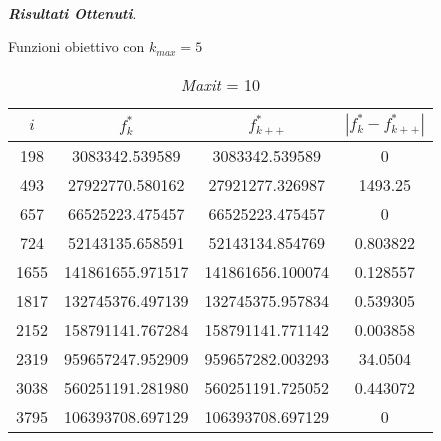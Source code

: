 \documentclass[12pt,a4paper,oneside,hidelinks]{report}
\begin{document}
\paragraph*{}
\textbf{\textit{Risultati Ottenuti}}.

\vspace*{\fill}


\begin{table}[ht]%
	\centering
	\caption{Funzioni obiettivo con $k_{max} = 5$}\label{tab:b1}

	\def\arraystretch{1.4}

	\begin{subtable}{\textwidth}
		\centering
		\begin{tabular}{|S[table-parse-only = true]
						|S[table-format = 9.6, table-number-alignment = center]
						|S[table-format = 9.6, table-number-alignment = center]
						|S[table-parse-only = true]|}
			
			\hline			
			{$i$} & {$f_{k}^*$} & {$f_{k++}^*$} & {$|f_{k}^* - f_{k++}^*|$} \\
			
			\hline		
		
			198  &  3083342.539589   & 3083342.539589   & 0  \\
			493  &  27922770.580162  & 27921277.326987  & 1493.25 \\
			657  &  66525223.475457  & 66525223.475457  & 0 \\
			724  &  52143135.658591  & 52143134.854769  & 0.803822 \\
			1655 &  141861655.971517 & 141861656.100074 & 0.128557 \\
			1817 &  132745376.497139 & 132745375.957834 & 0.539305  \\
			2152 &	158791141.767284 & 158791141.771142 & 0.003858 \\
			2319 &  959657247.952909 & 959657282.003293 & 34.0504 \\
			3038 &  560251191.281980 & 560251191.725052 & 0.443072 \\
			3795 &  106393708.697129 & 106393708.697129 & 0 \\
	
			\hline
		\end{tabular}	
			
		\vspace*{0.4 cm}
		\caption{\textit{Maxit} = 10}
	\end{subtable}%
	
	\vspace*{1.9 cm}
	

\end{table}
\end{document}
